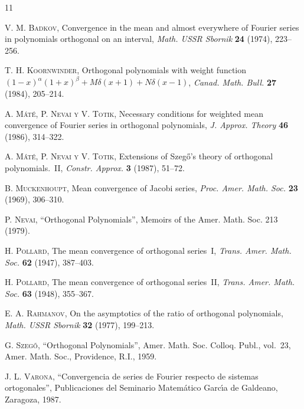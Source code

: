 \documentclass[a4paper,12pt]{article}
\theoremstyle{plain}
\theoremstyle{definition}
\begin{document}
\renewcommand{\refname}{\large Referencias}
\begin{thebibliography}{11}

\frenchspacing

\textsc{V. M. Badkov},
Convergence in the mean and almost everywhere
of Fourier series in polynomials orthogonal on an interval,
\textit{Math. USSR Sbornik} \textbf{24} (1974), 223--256.

\textsc{T. H. Koornwinder},
Orthogonal polynomials with weight function
$(1-x)^{\alpha} (1+x)^{\beta} + M \delta(x+1) + N \delta(x-1)$,
\textit{Canad. Math. Bull.} \textbf{27} (1984), 205--214.

\textsc{A. M\'at\'e, P. Nevai y V. Totik},
Necessary conditions for weighted mean convergence of Fourier
series in orthogonal polynomials,
\textit{J. Approx. Theory} \textbf{46} (1986), 314--322.

\textsc{A. M\'at\'e, P. Nevai y V. Totik},
Extensions of Szeg\H{o}'s theory of orthogonal polynomials.~II,
\textit{Constr. Approx.} \textbf{3} (1987), 51--72.

\textsc{B. Muckenhoupt},
Mean convergence of Jacobi series,
\textit{Proc. Amer. Math. Soc.} \textbf{23} (1969), 306--310.

\textsc{P. Nevai}, ``Orthogonal Polynomials'',
Memoirs of the Amer. Math. Soc. 213 (1979).

\textsc{H. Pollard},
The mean convergence of orthogonal series~I,
\textit{Trans. Amer. Math. Soc.} \textbf{62} (1947), 387--403.

\textsc{H. Pollard},
The mean convergence of orthogonal series~II,
\textit{Trans. Amer. Math. Soc.} \textbf{63} (1948), 355--367.

\textsc{E. A. Rahmanov},
On the asymptotics of the ratio of orthogonal polynomials,
\textit{Math. USSR Sbornik} \textbf{32} (1977), 199--213.

\textsc{G. Szeg\H{o}},
``Orthogonal Polynomials'',
Amer. Math. Soc. Colloq. Publ., vol.~23,
Amer. Math. Soc., Providence, R.I., 1959.

\textsc{J. L. Varona},
``Convergencia de series de Fourier respecto de sistemas ortogonales'',
Publicaciones del Seminario Matem\'atico Garc\'{\i}a
de Galdeano, Zaragoza, 1987.

\end{thebibliography}
\end{document}
